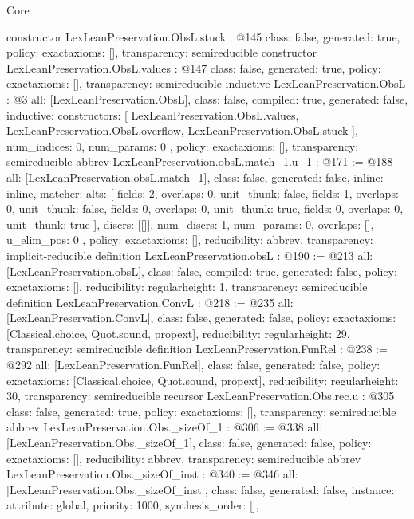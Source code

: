 \begin{lexlean}{Core}
\begin{coremodule}
{}
constructor LexLeanPreservation.ObsL.stuck : @145 {
  class: false,
  generated: true,
  policy: exact{axioms: []},
  transparency: semireducible
}
constructor LexLeanPreservation.ObsL.values : @147 {
  class: false,
  generated: true,
  policy: exact{axioms: []},
  transparency: semireducible
}
inductive LexLeanPreservation.ObsL : @3 {
  all: [LexLeanPreservation.ObsL],
  class: false,
  compiled: true,
  generated: false,
  inductive: {
    constructors: [
      LexLeanPreservation.ObsL.values,
      LexLeanPreservation.ObsL.overflow,
      LexLeanPreservation.ObsL.stuck
    ],
    num_indices: 0,
    num_params: 0
  },
  policy: exact{axioms: []},
  transparency: semireducible
}
abbrev LexLeanPreservation.obsL.match_1.{u_1} : @171 := @188 {
  all: [LexLeanPreservation.obsL.match_1],
  class: false,
  generated: false,
  inline: inline,
  matcher: {
    alts: [
      {fields: 2, overlaps: 0, unit_thunk: false},
      {fields: 1, overlaps: 0, unit_thunk: false},
      {fields: 0, overlaps: 0, unit_thunk: true},
      {fields: 0, overlaps: 0, unit_thunk: true}
    ],
    discrs: [[]],
    num_discrs: 1,
    num_params: 0,
    overlaps: [],
    u_elim_pos: 0
  },
  policy: exact{axioms: []},
  reducibility: abbrev{},
  transparency: implicit-reducible
}
definition LexLeanPreservation.obsL : @190 := @213 {
  all: [LexLeanPreservation.obsL],
  class: false,
  compiled: true,
  generated: false,
  policy: exact{axioms: []},
  reducibility: regular{height: 1},
  transparency: semireducible
}
definition LexLeanPreservation.ConvL : @218 := @235 {
  all: [LexLeanPreservation.ConvL],
  class: false,
  generated: false,
  policy: exact{axioms: [Classical.choice, Quot.sound, propext]},
  reducibility: regular{height: 29},
  transparency: semireducible
}
definition LexLeanPreservation.FunRel : @238 := @292 {
  all: [LexLeanPreservation.FunRel],
  class: false,
  generated: false,
  policy: exact{axioms: [Classical.choice, Quot.sound, propext]},
  reducibility: regular{height: 30},
  transparency: semireducible
}
recursor LexLeanPreservation.Obs.rec.{u} : @305 {
  class: false,
  generated: true,
  policy: exact{axioms: []},
  transparency: semireducible
}
abbrev LexLeanPreservation.Obs._sizeOf_1 : @306 := @338 {
  all: [LexLeanPreservation.Obs._sizeOf_1],
  class: false,
  generated: false,
  policy: exact{axioms: []},
  reducibility: abbrev{},
  transparency: semireducible
}
abbrev LexLeanPreservation.Obs._sizeOf_inst : @340 := @346 {
  all: [LexLeanPreservation.Obs._sizeOf_inst],
  class: false,
  generated: false,
  instance: {attribute: global, priority: 1000, synthesis_order: []},
}
\end{coremodule}
\end{lexlean}

